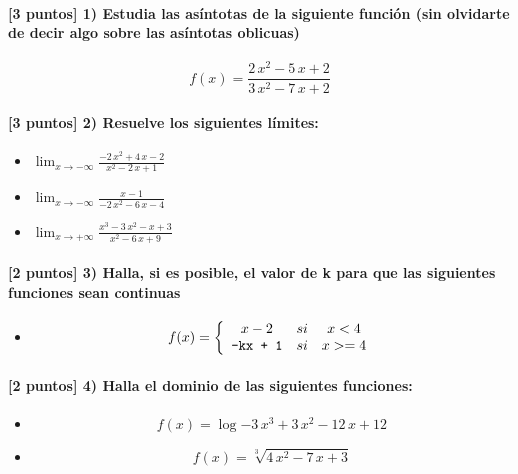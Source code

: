 \paragraph{[3 puntos] 1) Estudia las asíntotas de la siguiente función (sin olvidarte de decir algo sobre las asíntotas oblicuas)} \[f(x) = \frac{ 2 \, x^{2} - 5 \, x + 2 }{ 3 \, x^{2} - 7 \, x + 2 }\] \paragraph{[3 puntos] 2) Resuelve los siguientes límites:}\begin{itemize}\item $\displaystyle\lim_{x\to-\infty} \frac{ -2 \, x^{2} + 4 \, x - 2 }{ x^{2} - 2 \, x + 1 }$ \item $\displaystyle\lim_{x\to-\infty} \frac{ x - 1 }{ -2 \, x^{2} - 6 \, x - 4 }$ \item $\displaystyle\lim_{x\to+\infty} \frac{ x^{3} - 3 \, x^{2} - x + 3 }{ x^{2} - 6 \, x + 9 }$\end{itemize} \paragraph{[2 puntos] 3) Halla, si es posible, el valor de k para que las siguientes funciones sean continuas}\begin{itemize} \item\[ f(x)=\left\{\begin{array}{ccc} x - 2 & si & x<4 \\ \text{\texttt{{-}kx{ }+{ }1}} & si & x>=4 \\ \end{array}\right. \] \end{itemize} \paragraph{[2 puntos] 4) Halla el dominio de las siguientes funciones:}\begin{itemize} \item \[f(x) = \log{ -3 \, x^{3} + 3 \, x^{2} - 12 \, x + 12 }\] \item \[f(x) = \sqrt[3]{ 4 \, x^{2} - 7 \, x + 3 }\] \end{itemize}